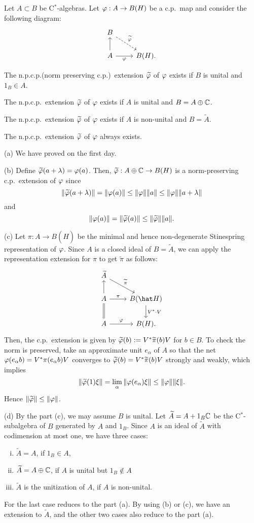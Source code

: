 \documentclass{../../../small}
\begin{document}
\begin{thm}
Let $A\subset B$ be C$^*$-algebras.
Let $\varphi:A\to B(H)$ be a c.p.~map and consider the following diagram:
\[\begin{tikzcd}
 B\ar[dashed]{dr}{\tilde\f}&\\
 A\ar{u}\ar[swap]{r}{\f}&B(H).
\end{tikzcd}\]
\begin{parts}
\item The n.p.c.p.(norm preserving c.p.)~extension $\widetilde{\varphi}$ of $\varphi$ exists if $B$ is unital and $1_ B\in A$.
\item The n.p.c.p.~extension $\widetilde{\varphi}$ of $\varphi$ exists if $A$ is unital and $B= A\oplus\mathbb{C}$.
\item The n.p.c.p.~extension $\widetilde{\varphi}$ of $\varphi$ exists if $A$ is non-unital and $B=\tilde A$.
\item The n.p.c.p.~extension $\widetilde{\varphi}$ of $\varphi$ always exists.
\end{parts}
\end{thm}
\begin{pf}
(a) We have proved on the first day.

(b)
Define $\widetilde{\varphi}(a+\lambda)=\varphi(a)$.
Then, $\widetilde{\varphi}:A\oplus\mathbb{C}\to B(H)$ is a norm-preserving c.p.~extension of $\varphi$ since
\[\|\widetilde{\varphi}(a+\lambda)\|=\|\varphi(a)\|\le\|\varphi\|\|a\|\le\|\varphi\|\|a+\lambda\|\]
and
\[\|\varphi(a)\|=\|\widetilde{\varphi}(a)\|\le\|\widetilde{\varphi}\|\|a\|.\]

(c)
Let $\pi:A\to B(\hat H)$ be the minimal and hence non-degenerate Stinespring representation of $\varphi$.
Since $A$ is a closed ideal of $B=\tilde A$, we can apply the representation extension for $\pi$ to get $\tilde\pi$ as follows:
\[\begin{tikzcd}
\tilde A\ar{dr}{\tilde\pi}&\\
 A\ar{u}\ar{r}{\pi}&B(\hat H)\ar{d}{V^*\cdot V}\\
 A\ar[equal]{u}\ar{r}{\f}&B(H).
\end{tikzcd}\]
Then, the c.p.~extension is given by $\widetilde{\varphi}(b):=V^*\widetilde\pi(b)V$ for $b\in B$.
To check the norm is preserved, take an approximate unit $e_\alpha$ of $A$ so that the net $\varphi(e_\alpha b)=V^*\pi(e_\alpha b)V$ converges to $\widetilde{\varphi}(b)=V^*\widetilde\pi(b)V$ strongly and weakly, which implies
\[\|\widetilde{\varphi}(1)\xi\|=\lim_\alpha\|\varphi(e_\alpha)\xi\|\le\|\varphi\|\|\xi\|.\]
Hence $\|\widetilde{\varphi}\|\le\|\varphi\|$.

(d)
By the part (c), we may assume $B$ is unital.
Let $\widetilde A= A+1_ B\mathbb{C}$ be the C$^*$-subalgebra of $B$ generated by $A$ and $1_ B$.
Since $A$ is an ideal of $\tilde A$ with codimension at most one, we have three cases:
\begin{enumerate}[(i)]
\item $\tilde A= A$, if $1_ B\in A$,
\item $\widetilde A= A\oplus\mathbb{C}$, if $A$ is unital but $1_ B\notin A$
\item $\tilde A$ is the unitization of $A$, if $A$ is non-unital.
\end{enumerate}
For the last case reduces to the part (a). 
By using (b) or (c), we have an extension to $\tilde A$, and the other two cases also reduce to the part (a).
\end{pf}
\end{document}
